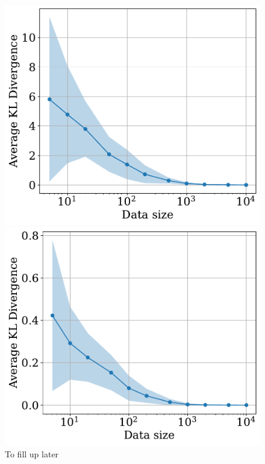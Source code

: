 \begin{figure}
\begin{minipage}{0.32\textwidth}
    \includegraphics[width = \linewidth]{plots/joint_dist_div.pdf}
    \end{minipage}
    \begin{minipage}{0.32\textwidth}
    \includegraphics[width = \linewidth]{plots/marginals_kl_divergence.pdf}
    \end{minipage}
    \caption{To fill up later}
    \label{fig:kl_div}
\end{figure}

